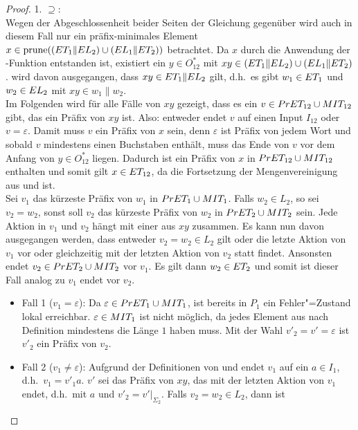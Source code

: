 \begin{proof}
  1. \glqq$\supseteq$\grqq{}:\\
  Wegen der Abgeschlossenheit beider Seiten der Gleichung gegenüber \cont{}
  wird auch in diesem Fall nur ein präfix-minimales Element $x\in\mathrm{prune} ((ET
  _1\|EL _2)\cup (EL _1\| ET _2))$ betrachtet. Da $x$ durch die Anwendung
  der \prune{}-Funktion entstanden ist, existiert ein $y\in O_{12} ^*$ mit
  $xy\in (ET _1\|EL _2)\cup (EL _1\| ET _2)$. \OBdA{} wird davon
  ausgegangen, dass $xy\in ET _1\| EL _2$ gilt, d.h.\ es gibt $w_1\in ET _1$
  und $w_2\in EL _2$ mit $xy \in w_1\| w_2$.\\
  Im Folgenden wird für alle Fälle von $xy$ gezeigt, dass es ein $v\in PrET
  _{12} \cup MIT _{12}$ gibt, das ein Präfix von $xy$ ist. Also: entweder
  endet $v$ auf einen Input $I_{12}$ oder $v=\varepsilon$. Damit muss $v$ ein
  Präfix von $x$ sein, denn $\varepsilon$ ist Präfix von jedem Wort und sobald
  $v$ mindestens einen Buchstaben enthält, muss das Ende von $v$ vor dem Anfang
  von $y\in O_{12}^*$ liegen. Dadurch ist ein Präfix von $x$ in $PrET
  _{12}\cup MIT _{12}$ enthalten und somit gilt $x\in ET _{12}$, da \ET{} die
  Fortsetzung der Mengenvereinigung aus \PrET{} und \MIT{} ist.\\
  Sei $v_1$ das kürzeste Präfix von $w_1$ in $PrET _1\cup MIT _1$. Falls $w_2
  \in L_2$, so sei $v_2=w_2$, sonst soll $v_2$ das kürzeste Präfix von $w_2$ in
  $PrET _2\cup MIT _2$ sein. Jede Aktion in $v_1$ und $v_2$ hängt mit einer
  aus $xy$ zusammen. Es kann nun davon ausgegangen werden, dass entweder $v_2 =
  w_2\in L_2$ gilt oder die letzte Aktion von $v_1$ vor oder gleichzeitig mit
  der letzten Aktion von $v_2$ statt findet. Ansonsten endet $v_2 \in PrET
  _2\cup MIT _2$ vor $v_1$. Es gilt dann $w_2\in ET _2$ und somit ist dieser
  Fall analog zu $v_1$ endet vor $v_2$.
  \begin{itemize}
    \item Fall 1 ($v_1=\varepsilon$): Da $\varepsilon\in PrET _1\cup MIT _1$,
      ist bereits in $P_1$ ein Fehler"=Zustand lokal erreichbar. $\varepsilon
      \in MIT _1$ ist nicht möglich, da jedes Element aus \MIT{} nach
      Definition mindestens die Länge $1$ haben muss. Mit der Wahl
      $v'_2=v'=\varepsilon$ ist $v'_2$ ein Präfix von $v_2$.
    \item Fall 2 ($v_1\neq\varepsilon$): Aufgrund der Definitionen von \PrET{}
      und \MIT{} endet $v_1$ auf ein $a\in I_1$, d.h.\ $v_1=v'_1a$. $v'$ sei
      das Präfix von $xy$, das mit der letzten Aktion von $v_1$ endet, d.h.\
      mit $a$ und $v'_2=v'|_{\Sigma _2}$. Falls $v_2=w_2\in L_2$, dann ist

\end{itemize}
\end{proof}
